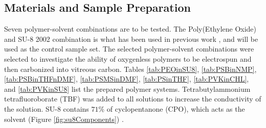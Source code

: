 
\subsection{Materials and Sample Preparation}

Seven polymer-solvent combinations are to be tested. The Poly(Ethylene Oxide) and SU-8 2002 combination is what has been used in previous work \cite{Cardenas2017, Flores2017}, and will be used as the control sample set. The selected polymer-solvent combinations were selected to investigate the ability of oxygenless polymers to be electrospun and then carbonized into vitreous carbon. Tables \ref{tab:PEOinSU8}, \ref{tab:PSBinNMP}, \ref{tab:PSBinTHFnDMF}, \ref{tab:PSMSinDMF}, \ref{tab:PSinTHF}, \ref{tab:PVKinCHL}, and \ref{tab:PVKinSU8} list the prepared polymer systems. Tetrabutylammonium tetrafluoroborate (TBF) was added to all solutions to increase the conductivity of the solution. SU-8 contains $71\%$ of cyclopentanone (CPO), which acts as the solvent (Figure \ref{fig:su8Components}) \cite{Microchem2012}.

